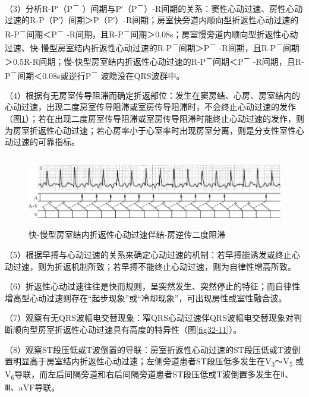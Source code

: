 （3）分析R-P′（P\textsuperscript{－} ）间期与P′（P\textsuperscript{－}）-R间期的关系：窦性心动过速、房性心动过速的R-P（P′）间期＞P（P′）-R间期；房室快旁道内顺向型折返性心动过速的R-P\textsuperscript{－}间期＜P\textsuperscript{－} -R间期，且R-P\textsuperscript{－}间期＞0.08s；房室慢旁道内顺向型折返性心动过速、快-慢型房室结内折返性心动过速的R-P\textsuperscript{－}间期＞P\textsuperscript{－} -R间期，且R-P\textsuperscript{－}间期＞0.5R-R间期；慢-快型房室结内折返性心动过速的R-P\textsuperscript{－}间期＜P\textsuperscript{－} -R间期，且R-P\textsuperscript{－}间期＜0.08s或逆行P\textsuperscript{－} 波隐没在QRS波群中。

（4）根据有无房室传导阻滞而确定折返部位：发生在窦房结、心房、房室结内的心动过速，出现二度房室传导阻滞或室房传导阻滞时，不会终止心动过速的发作（图\ref{fig32-13}）；若在出现二度房室传导阻滞或室房传导阻滞时能终止心动过速的发作，则为房室折返性心动过速；若心房率小于心室率时出现房室分离，则是分支性室性心动过速的可靠指标。

\begin{figure}[!htbp]
 \centering
 \includegraphics[width=5.80208in,height=1.22917in]{./images/Image00529.jpg}
 \captionsetup{justification=centering}
 \caption{快-慢型房室结内折返性心动过速伴结-房逆传二度阻滞}
 \label{fig32-13}
  \end{figure} 

（5）根据早搏与心动过速的关系来确定心动过速的机制：若早搏能诱发或终止心动过速，则为折返机制所致；若早搏不能终止心动过速，则为自律性增高所致。

（6）折返性心动过速往往是快而规则，呈突然发生、突然停止的特征；而自律性增高型心动过速则存在“起步现象”或“冷却现象”，可出现房性或室性融合波。

（7）观察有无QRS波幅电交替现象：窄QRS心动过速伴QRS波幅电交替现象对判断顺向型房室折返性心动过速具有高度的特异性（图\ref{fig32-11}）。

（8）观察ST段压低或T波倒置的导联：房室折返性心动过速的ST段压低或T波倒置明显高于房室结内折返性心动过速；左侧旁道患者ST段压低多发生在V\textsubscript{3}～V\textsubscript{5} 或V\textsubscript{6}导联，而左后间隔旁道和右后间隔旁道患者ST段压低或T波倒置多发生在Ⅱ、Ⅲ、aVF导联。

\protect\hypertarget{text00040.html}{}{}


